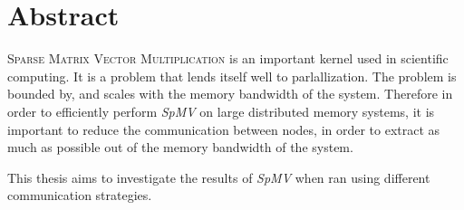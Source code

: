 \chapter{Abstract} \label{abstract}
\textsc{Sparse Matrix Vector Multiplication} is an important kernel used in scientific computing. It is a problem that lends itself well to parlallization. The problem is bounded by, and scales with the memory bandwidth of the system. Therefore in order to efficiently perform \textit{SpMV} on large distributed memory systems, it is important to reduce the communication between nodes, in order to extract as much as possible out of the memory bandwidth of the system.

This thesis aims to investigate the results of \textit{SpMV} when ran using different communication strategies.

